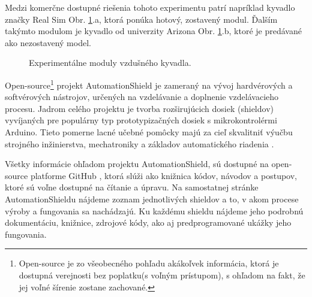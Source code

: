 Medzi komerčne dostupné riešenia tohoto experimentu patrí napríklad kyvadlo značky Real Sim Obr. \ref{OBRAZOK 1.2}.a, ktorá ponúka hotový, zostavený modul. Ďalším takýmto modulom je kyvadlo od univerzity Arizona \cite{enikov_campa_2012} Obr. \ref{OBRAZOK 1.2}.b, ktoré je predávané ako nezostavený model. 

\begin{figure}[!tbh]
	\hfill
	\hfill
	\hfill
	\caption{Experimentálne moduly vzdušného kyvadla.}\label{OBRAZOK 1.2}
\end{figure}

\newpage
Open-source\footnote[1]{Open-source je zo všeobecného pohľadu akákoľvek informácia, ktorá je dostupná verejnosti bez poplatku(s voľným prístupom), s ohľadom na fakt, že jej voľné šírenie zostane zachované.} projekt AutomationShield je zameraný na vývoj hardvérových a softvérových nástrojov, určených na vzdelávanie a doplnenie vzdelávacieho procesu. Jadrom celého projektu je tvorba rozširujúcich dosiek (shieldov) vyvíjaných pre populárny typ prototypizačných dosiek s mikrokontrolérmi Arduino. Tieto pomerne lacné učebné pomôcky majú za cieľ skvalitniť výučbu strojného inžinierstva, mechatroniky a základov automatického riadenia \cite{Auto}.

Všetky informácie ohľadom projektu AutomationShield, sú dostupné na open-source platforme GitHub \cite{Git}, ktorá slúži ako knižnica kódov, návodov a postupov, ktoré sú voľne dostupné na čítanie a úpravu. Na samostatnej stránke AutomationShieldu nájdeme zoznam jednotlivých shieldov a to, v akom procese výroby a fungovania sa nachádzajú. Ku každému shieldu nájdeme jeho podrobnú dokumentáciu, knižnice, zdrojové kódy, ako aj predprogramované ukážky jeho fungovania. 

